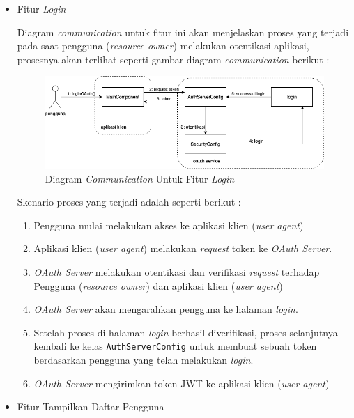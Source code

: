 \documentclass[pdftex,12pt, oneside]{article}
\begin{document}
\begin{itemize}
	\item Fitur \textit{Login}
	
	Diagram \textit{communication} untuk fitur ini akan menjelaskan proses yang terjadi pada saat pengguna (\textit{resource owner}) melakukan otentikasi aplikasi, prosesnya akan terlihat seperti gambar diagram \textit{communication} berikut :
	
	\begin{figure}[H]
		\centering
		\includegraphics[width=1\textwidth]{./resources/comm-dia-login}
		\caption{Diagram \textit{Communication} Untuk Fitur \textit{Login}}
		\label{fig:comm-dia-login}
	\end{figure}
	
	Skenario proses yang terjadi adalah seperti berikut :
	
	\begin{enumerate}
		\item Pengguna mulai melakukan akses ke aplikasi klien (\textit{user agent})
		\item Aplikasi klien (\textit{user agent}) melakukan \textit{request} token ke \textit{OAuth Server}.
		\item \textit{OAuth Server} melakukan otentikasi dan verifikasi \textit{request} terhadap Pengguna (\textit{resource owner}) dan aplikasi klien (\textit{user agent})
		\item \textit{OAuth Server} akan mengarahkan pengguna ke halaman \textit{login}.
		\item Setelah proses di halaman \textit{login} berhasil diverifikasi, proses selanjutnya kembali ke kelas \texttt{AuthServerConfig} untuk membuat sebuah token berdasarkan pengguna yang telah melakukan \textit{login}.
		\item \textit{OAuth Server} mengirimkan token JWT ke aplikasi klien (\textit{user agent})
	\end{enumerate}
	
	\item Fitur Tampilkan Daftar Pengguna
	

\end{itemize}
\end{document}
